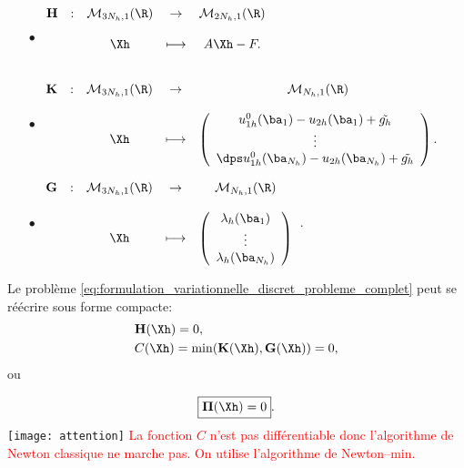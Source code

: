 \documentclass{beamer}
\begin{document}
\begin{frame}
\begin{itemize}
\item[$\bullet$]
$\begin{array}{ccccc}
\textbf{H} & : &\mathcal{M}_{3N_h,1}(\R) & \to & \mathcal{M}_{2N_h,1}(\R) \\\\
 & & \Xh
 & \longmapsto & A\Xh-F.\\\\
\end{array}$

\item[$\bullet$]$
\begin{array}{ccccc}
\textbf{K} & : & \mathcal{M}_{3 N_h,1}(\R) & \to &\mathcal{M}_{N_h,1}(\R) \\\\
 & & \Xh
 & \longmapsto & \left(\begin{array}{c}
u_{1h}^0({{\ba}_1})-u_{2h}({{\ba}_1})+\tilde{g_h}\\
\vdots\\
\dps u_{1h}^0({{\ba}_{N_h}})-u_{2h}({{\ba}_{N_h}})+\tilde{g_h}\\ 
\end{array}\right).
\end{array}$
\item[$\bullet$]$
\begin{array}{ccccc}
\textbf{G} & : &  \mathcal{M}_{3 N_h,1}(\R) & \to & \mathcal{M}_{N_h,1}(\R) \\\\
& & {\Xh} & \longmapsto & \left(\begin{array}{c}
\lambda_h({{\ba}_1})\\
\vdots\\
\lambda_h({{\ba}_{N_h}})\\ 
\end{array}\right)
\end{array}$.
\end{itemize}
\end{frame}
\begin{frame}
Le problème \eqref{eq:formulation_variationnelle_discret_probleme_complet} peut se réécrire sous forme compacte:
\begin{align}
&{\bf H}(\Xh)=0,
\label{eq: pp}\\
&C(\Xh)=\min({\bf K}(\Xh),{\bf G}(\Xh))=0,
\label{eq: ppp}
\end{align}
ou 

\begin{equation}
\boxed{{\bm \Pi}(\Xh)=0}.
\end{equation}
\texttt{[image: attention]} \quad \textcolor{red}{La fonction $C$ n'est pas différentiable donc l'algorithme de Newton classique ne marche pas. On utilise l'algorithme de Newton--min.}
\end{frame}
\end{document}
